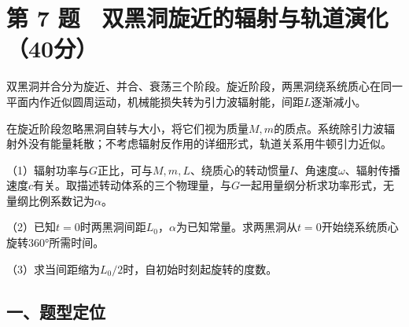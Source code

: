 \documentclass[12pt,a4paper,fontset=fandol]{ctexart}
\begin{document}
\section{第 7
题　双黑洞旋近的辐射与轨道演化（40分）}\label{ux7b2c-7-ux9898-ux53ccux9ed1ux6d1eux65cbux8fd1ux7684ux8f90ux5c04ux4e0eux8f68ux9053ux6f14ux531640ux5206}

双黑洞并合分为旋近、并合、衰荡三个阶段。旋近阶段，两黑洞绕系统质心在同一平面内作近似圆周运动，机械能损失转为引力波辐射能，间距\(L\)逐渐减小。

在旋近阶段忽略黑洞自转与大小，将它们视为质量\(M,m\)的质点。系统除引力波辐射外没有能量耗散；不考虑辐射反作用的详细形式，轨道关系用牛顿引力近似。

\begin{center}
\begin{minipage}{\linewidth}
\centering\begingroup{}
\ifdim\wd\diagrambox>.88\linewidth
\sbox{\diagrambox}{\resizebox{.88\linewidth}{!}{\usebox{\diagrambox}}}\fi
\ifdim\ht\diagrambox>.38\textheight
\resizebox{!}{.38\textheight}{\usebox{\diagrambox}}
\else\usebox{\diagrambox}\fi
\par{}\endgroup\end{minipage}\end{center}

（1）辐射功率与\(G\)正比，可与\(M,m,L\)、绕质心的转动惯量\(I\)、角速度\(\omega\)、辐射传播速度\(c\)有关。取描述转动体系的三个物理量，与\(G\)一起用量纲分析求功率形式，无量纲比例系数记为\(\alpha\)。

（2）已知\(t=0\)时两黑洞间距\(L_0\)，\(\alpha\)为已知常量。求两黑洞从\(t=0\)开始绕系统质心旋转360°所需时间。

（3）求当间距缩为\(L_0/2\)时，自初始时刻起旋转的度数。

\subsection{一、题型定位}\label{ux4e00ux9898ux578bux5b9aux4f4d-6}
\end{document}
